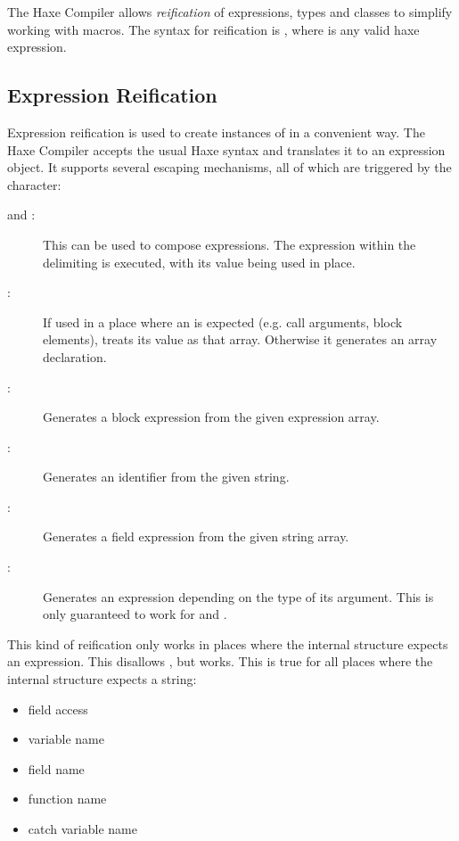 \documentclass{haxe}
\begin{document}
The Haxe Compiler allows \emph{reification} of expressions, types and classes to simplify working with macros. The syntax for reification is , where  is any valid haxe expression.

\subsection{Expression Reification}
\label{macro-reification-expression}

Expression reification is used to create instances of  in a convenient way. The Haxe Compiler accepts the usual Haxe syntax and translates it to an expression object. It supports several escaping mechanisms, all of which are triggered by the \expr{\$} character:

\begin{description}
	\item[\expr{\$\{\}} and :]  This can be used to compose expressions. The expression within the delimiting \expr{\{ \}} is executed, with its value being used in place.
	\item[:]  If used in a place where an  is expected (e.g. call arguments, block elements),  treats its value as that array. Otherwise it generates an array declaration.
	\item[:]  Generates a block expression from the given expression array.
	\item[:]  Generates an identifier from the given string.
	\item[:]  Generates a field expression from the given string array.
	\item[:]  Generates an expression depending on the type of its argument. This is only guaranteed to work for  and .
\end{description}

This kind of reification only works in places where the internal structure expects an expression. This disallows , but  works. This is true for all places where the internal structure expects a string:

\begin{itemize}
	\item field access 
	\item variable name 
\end{itemize}
\begin{itemize}
	\item field name 
	\item function name 
	\item catch variable name 
\end{itemize}
\end{document}
